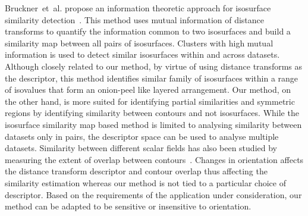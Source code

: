 \documentclass[review,journal]{vgtc}         %
\begin{document}
Bruckner~et~al. propose an information theoretic approach for isosurface similarity 
detection~\cite{BrucknerM10,haidacher11}. This method uses mutual information of distance 
transforms to quantify the information common to two isosurfaces and build a similarity map 
between all pairs of isosurfaces. Clusters with high mutual information is used to detect 
similar isosurfaces within and across datasets. Although closely related to our method, 
by virtue of using distance transforms as the descriptor, 
this method identifies similar family of isosurfaces within a range of isovalues that 
form an onion-peel like layered arrangement. Our method, on the other hand, is more suited 
for identifying partial similarities and symmetric regions by identifying
similarity between contours and not isosurfaces. While the isosurface similarity map based
method is limited to analysing similarity between
datasets only in pairs, the descriptor space can be used to analyse multiple datasets.
Similarity between different scalar fields has also been studied by measuring the extent of overlap
between contours~\cite{SchneiderWCHS08,schn13}. Changes in orientation affects the distance transform
descriptor and contour overlap thus affecting the similarity estimation whereas our method is not tied 
to a particular choice of descriptor. Based on the requirements of the application under 
consideration, our method  can be adapted to be sensitive or insensitive to orientation. 
\end{document}
